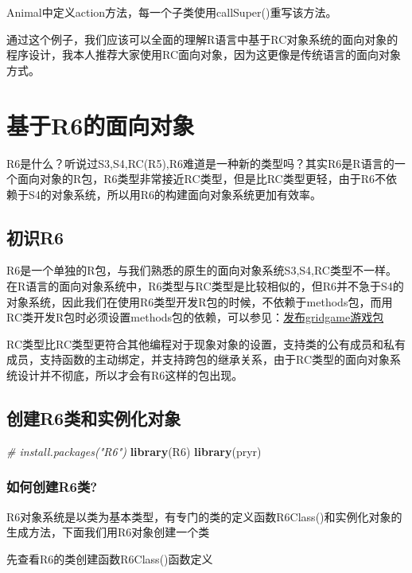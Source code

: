\documentclass[]{book}
\newenvironment{Shaded}{\begin{snugshade}}{\end{snugshade}}
\newcommand{\KeywordTok}[1]{\textcolor[rgb]{0.13,0.29,0.53}{\textbf{#1}}}
\newcommand{\CommentTok}[1]{\textcolor[rgb]{0.56,0.35,0.01}{\textit{#1}}}
\newcommand{\NormalTok}[1]{#1}
\begin{document}
Animal中定义action方法，每一个子类使用callSuper()重写该方法。

通过这个例子，我们应该可以全面的理解R语言中基于RC对象系统的面向对象的程序设计，我本人推荐大家使用RC面向对象，因为这更像是传统语言的面向对象方式。

\chapter{基于R6的面向对象}\label{R6}

R6是什么？听说过S3,S4,RC(R5),R6难道是一种新的类型吗？其实R6是R语言的一个面向对象的R包，R6类型非常接近RC类型，但是比RC类型更轻，由于R6不依赖于S4的对象系统，所以用R6的构建面向对象系统更加有效率。

\section{初识R6}\label{r6}

R6是一个单独的R包，与我们熟悉的原生的面向对象系统S3,S4,RC类型不一样。在R语言的面向对象系统中，R6类型与RC类型是比较相似的，但R6并不急于S4的对象系统，因此我们在使用R6类型开发R包的时候，不依赖于methods包，而用RC类开发R包时必须设置methods包的依赖，可以参见：\href{http://blog.fens.me/tag/package/}{发布gridgame游戏包}

RC类型比RC类型更符合其他编程对于现象对象的设置，支持类的公有成员和私有成员，支持函数的主动绑定，并支持跨包的继承关系，由于RC类型的面向对象系统设计并不彻底，所以才会有R6这样的包出现。

\section{创建R6类和实例化对象}\label{r6}

\begin{Shaded}
\begin{Highlighting}[]
\CommentTok{# install.packages("R6")}
\KeywordTok{library}\NormalTok{(R6)}
\KeywordTok{library}\NormalTok{(pryr)}
\end{Highlighting}
\end{Shaded}

\subsection{如何创建R6类?}\label{r6}

R6对象系统是以类为基本类型，有专门的类的定义函数R6Class()和实例化对象的生成方法，下面我们用R6对象创建一个类

先查看R6的类创建函数R6Class()函数定义
\end{document}
